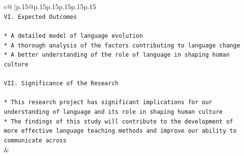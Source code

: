 \documentclass{article}
\begin{document}
{\begin{supertabular}{c@{$\;$}|p{.15\linewidth}@{}p{.15\linewidth}p{.15\linewidth}p{.15\linewidth}p{.15\linewidth}p{.15\linewidth}}
{{{\\ 
\texttt{VI. Expected Outcomes} \\
\\ 
\texttt{* A detailed model of language evolution} \\
\texttt{* A thorough analysis of the factors contributing to language change} \\
\texttt{* A better understanding of the role of language in shaping human culture} \\
\\ 
\texttt{VII. Significance of the Research} \\
\\ 
\texttt{* This research project has significant implications for our understanding of language and its role in shaping human culture} \\
\texttt{* The findings of this study will contribute to the development of more effective language teaching methods and improve our ability to communicate across} \\
            }
        }
    }
    & \\ \\

\end{supertabular}
}
\end{document}
